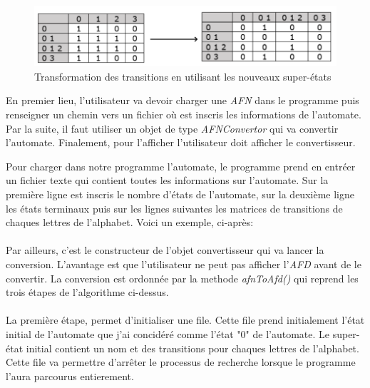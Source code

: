 \documentclass[a4paper]{article}
\begin{document}
\begin{figure}[!h]
	\centering
	\includegraphics[scale=0.6]{src/etape3_AFNtoAFD.PNG}
	\caption{Transformation des transitions en utilisant les nouveaux super-états}
\end{figure}

En premier lieu, l'utilisateur va devoir charger une \textit{AFN} dans le programme puis
renseigner un chemin vers un fichier où est inscris les informations de l'automate. Par la 
suite, il faut utiliser un objet de type \textit{AFNConvertor} qui va convertir l'automate.
Finalement, pour l'afficher l'utilisateur doit afficher le convertisseur. 

Pour charger dans notre programme l'automate, le programme prend en entréer un fichier texte
qui contient toutes les informations sur l'automate. Sur la première ligne est inscris le 
nombre d'états de l'automate, sur la deuxième ligne les états terminaux puis sur les lignes
suivantes les matrices de transitions de chaques lettres de l'alphabet. Voici un exemple, ci-après:\\

\fbox{
	
}\\

Par ailleurs, c'est le constructeur de l'objet convertisseur qui va lancer la conversion.
L'avantage est que l'utilisateur ne peut pas afficher l'\textit{AFD} avant de le convertir. La 
conversion est ordonnée par la methode \textit{afnToAfd()} qui reprend les trois étapes 
de l'algorithme ci-dessus.\\

\fbox{
	
}\\

La première étape, permet d'initialiser une file. Cette file prend initialement l'état 
initial de l'automate que j'ai concidéré comme l'état "0" de l'automate. Le super-état initial
contient un nom et des transitions pour chaques lettres de l'alphabet. Cette file va 
permettre d'arrêter le processus de recherche lorsque le programme l'aura parcourus 
entierement.\\
\end{document}
